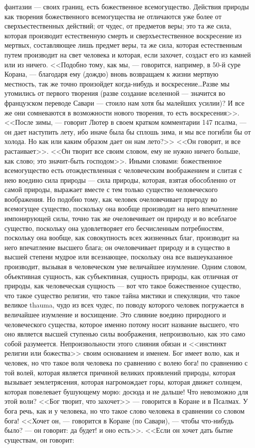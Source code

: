\documentclass[12pt]{article}
\begin{document}
фантазии --- своих границ, есть божественное всемогущество. Действия природы как творения божественного всемогущества не отличаются уже более от сверхъестественных действий; от чудес, от предметов веры; это та же сила, которая производит естественную смерть и сверхъестественное воскресение из мертвых, составляющее лишь предмет веры, та же сила, которая естественным путем производит на свет человека и которая, если захочет, создаст его из камней или из ничего. <<Подобно тому, как мы, --- говорится, например, в 50-й суре Корана, --- благодаря ему (дождю) вновь возвращаем к жизни мертвую местность, так же точно произойдет когда-нибудь и воскресение\dots Разве мы утомились от первого творения (разве создание вселенной --- значится во французском переводе Савари --- стоило нам хотя бы малейших усилии)? И все же они сомневаются в возможности нового творения, то есть воскресения>>. <<После зимы, --- говорит Лютер в своем кратком комментарии 147 псалма, --- он дает наступить лету, ибо иначе была бы сплошь зима, и мы все погибли бы от холода. Но как или каким образом дает он нам лето?>> <<Он говорит, и все растаивает>>. <<Он творит все своим словом, ему не нужно ничего больше, как слово; это значит-быть господом>>. Иными словами: божественное всемогущество есть отождествленная с человеческим воображением и слитая с нею воедино сила природы --- сила природы, которая, взятая обособленно от самой природы, выражает вместе с тем только существо человеческого воображения. Но подобно тому, как человек очеловечивает природу во всемогущее существо, поскольку она вообще производит на него впечатление импонирующей силы, точно так же очеловечивает он природу и во всеблагое существо, поскольку она удовлетворяет его бесчисленным потребностям, поскольку она вообще, как совокупность всех жизненных благ, производит на него впечатление высшего блага; он очеловечивает природу и в существо в высшей степени мудрое или всезнающее, поскольку она все вышеуказанное производит, вызывая в человеческом уме величайшее изумление. Одним словом, объективная сущность, как субъективная, сущность природы, как отличная от природы, как человеческая сущность --- вот что такое божественное существо, что такое существо религии, что такое тайна мистики и спекуляции, что такое великое thauma, чудо из всех чудес, по поводу которого человек погружается в величайшее изумление и восхищение. Это слияние воедино природного и человеческого существа, которое именно потому носит название высшего, что оно является высшей ступенью силы воображения, непроизвольно, как это само собой разумеется. Непроизвольности этого слияния обязан и <<инстинкт религии или божества>> своим основанием и именем. Бог имеет волю, как и человек, но что такое воля человека по сравнению с волею бога! по сравнению с той волей, которая является причиной великих проявлений природы, которая вызывает землетрясения, которая нагромождает горы, которая движет солнцем, которая повелевает бушующему морю: досюда и не дальше! Что невозможно для этой воли? <<Бог творит, что захочет>>  --- говорится в Коране и в Псалмах. У бога речь, как и у человека, но что такое слово человека в сравнении со словом бога! <<Хочет он, --- говорится в Коране (по Савари), --- чтобы что-нибудь было? --- он говорит: да будет! и оно есть>>. <<Если он хочет дать бытие существам, он говорит: 
\end{document}
